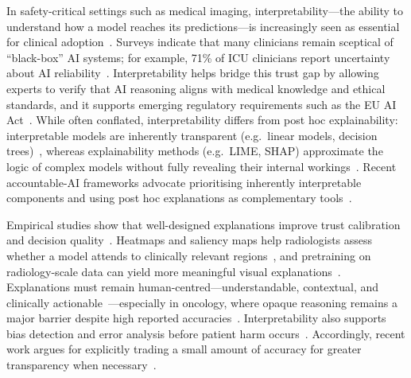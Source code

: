 \documentclass[final,british,a4paper,12pt]{phdthesis}
\begin{document}
In safety-critical settings such as medical imaging, interpretability—the ability to understand how a model reaches its predictions—is increasingly seen as essential for clinical adoption~\cite{abgrall2024should,chen2022explainable}. Surveys indicate that many clinicians remain sceptical of “black-box” AI systems; for example, 71\% of ICU clinicians report uncertainty about AI reliability~\cite{abgrall2024should}. Interpretability helps bridge this trust gap by allowing experts to verify that AI reasoning aligns with medical knowledge and ethical standards, and it supports emerging regulatory requirements such as the EU AI Act~\cite{abgrall2024should}. While often conflated, interpretability differs from post hoc explainability: interpretable models are inherently transparent (e.g.\ linear models, decision trees)~\cite{houssein2025explainable}, whereas explainability methods (e.g.\ LIME, SHAP) approximate the logic of complex models without fully revealing their internal workings~\cite{houssein2025explainable}. Recent accountable-AI frameworks advocate prioritising inherently interpretable components and using post hoc explanations as complementary tools~\cite{singh2025beyond,napravnik2025lessons}.

Empirical studies show that well-designed explanations improve trust calibration and decision quality~\cite{chen2022explainable,vani2025personalized}. Heatmaps and saliency maps help radiologists assess whether a model attends to clinically relevant regions~\cite{vani2025personalized,napravnik2025lessons}, and pretraining on radiology-scale data can yield more meaningful visual explanations~\cite{napravnik2025lessons}. Explanations must remain human-centred—understandable, contextual, and clinically actionable~\cite{chen2022explainable}—especially in oncology, where opaque reasoning remains a major barrier despite high reported accuracies~\cite{hrinivich2023interpretable}. Interpretability also supports bias detection and error analysis before patient harm occurs~\cite{abgrall2024should}. Accordingly, recent work argues for explicitly trading a small amount of accuracy for greater transparency when necessary~\cite{singh2025beyond}.
\end{document}
